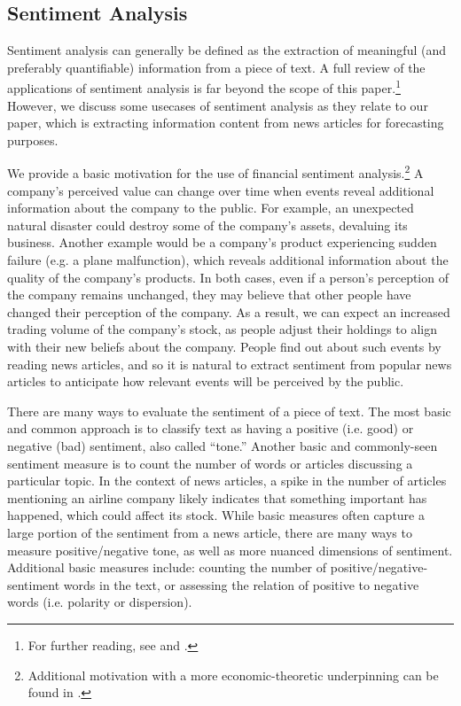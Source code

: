 \documentclass[12pt]{article}
\begin{document}
\subsection{Sentiment Analysis}
Sentiment analysis can generally be defined as the extraction of meaningful (and preferably quantifiable) information from a piece of text. A full review of the applications of sentiment analysis is far beyond the scope of this paper.\footnote{For further reading, see \textcite{mejova2009sentiment} and \textcite{wankhade2022survey}.} However, we discuss some usecases of sentiment analysis as they relate to our paper, which is extracting information content from news articles for forecasting purposes.

We provide a basic motivation for the use of financial sentiment analysis.\footnote{Additional motivation with a more economic-theoretic underpinning can be found in \textcite{kaplanski2010sentiment}.} A company's perceived value can change over time when events reveal additional information about the company to the public. For example, an unexpected natural disaster could destroy some of the company's assets, devaluing its business. Another example would be a company's product experiencing sudden failure (e.g. a plane malfunction), which reveals additional information about the quality of the company's products. In both cases, even if a person's perception of the company remains unchanged, they may believe that other people have changed their perception of the company. As a result, we can expect an increased trading volume of the company's stock, as people adjust their holdings to align with their new beliefs about the company. People find out about such events by reading news articles, and so it is natural to extract sentiment from popular news articles to anticipate how relevant events will be perceived by the public. 

There are many ways to evaluate the sentiment of a piece of text. The most basic and common approach is to classify text as having a positive (i.e. good) or negative (bad) sentiment, also called ``tone.'' Another basic and commonly-seen sentiment measure is to count the number of words or articles discussing a particular topic. In the context of news articles, a spike in the number of articles mentioning an airline company likely indicates that something important has happened, which could affect its stock. While basic measures often capture a large portion of the sentiment from a news article, there are many ways to measure positive/negative tone, as well as more nuanced dimensions of sentiment. Additional basic measures include: counting the number of positive/negative-sentiment words in the text, or assessing the relation of positive to negative words (i.e. polarity or dispersion).
\end{document}
